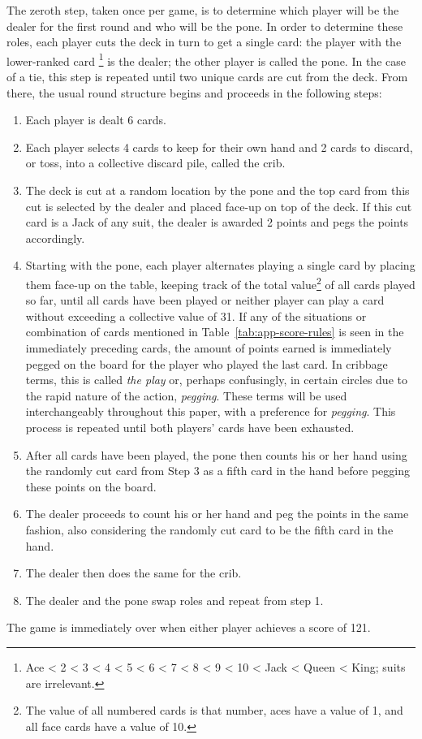 The zeroth step, taken once per game, is to determine which player will be the
dealer for the first round and who will be the pone.
%
In order to determine these roles,
each player cuts the deck in turn to get a single card:
the player with the lower-ranked card%
\footnote{Ace < 2 < 3 < 4 < 5 < 6 < 7 < 8 < 9 < 10 < Jack < Queen < King;
suits are irrelevant.}
is the dealer;
the other player is called the pone.
In the case of a tie, this step is repeated until two unique cards are
cut from the deck.
%
From there, the usual round structure begins and proceeds in the following
steps:
%
\begin{enumerate} %
%
\item Each player is dealt 6 cards.
%
\item Each player selects 4 cards to keep for their own hand and 2 cards to
	discard, or toss, into a collective discard pile, called the crib.
%
\item The deck is cut at a random location by the pone
	and the top card from this cut is selected by the dealer and placed
	face-up on top of the deck.
	If this cut card is a Jack of any suit,
	the dealer is awarded 2 points and pegs the points accordingly.
%
\item Starting with the pone, each player alternates playing a single card
	by placing them face-up on the table,
	keeping track of the total value\footnote{
		The value of all numbered cards is that number, aces have
		a value of 1, and all face cards have a value of 10.
	}
	of all cards played so far,
	until all cards have been played
	or neither player can play a card without exceeding a collective value of
	31.
	If any of the situations or combination of cards mentioned in
	Table~\ref{tab:app-score-rules} is seen in the immediately preceding cards,
	the amount of points earned is immediately pegged on the board for the
	player who played the last card.
	In cribbage terms, this is called \textit{the play}
	or, perhaps confusingly,
	in certain circles due to the rapid nature of the
	action, \textit{pegging}.
	These terms will be used interchangeably throughout this paper,
	with a preference for \textit{pegging}.
	This process is repeated until both players' cards have been exhausted.
%
\item After all cards have been played,
	the pone then counts his or her hand
	using the randomly cut card from Step 3 as a
	fifth card in the hand before pegging these points on the board.
%
\item The dealer proceeds to count his or her hand and peg the points
	in the same fashion, also considering the randomly cut card to be the
	fifth card in the hand.
%
\item The dealer then does the same for the crib.
%
\item The dealer and the pone swap roles and repeat from step 1.
%
\end{enumerate}
%
The game is immediately over when either player achieves a score
of 121.


